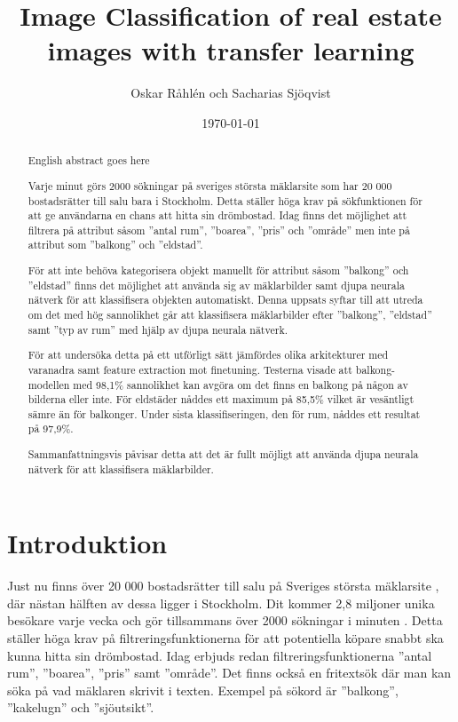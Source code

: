 \documentclass[]{kththesis}
\title{Image Classification of real estate images with transfer learning}
\author{Oskar Råhlén och Sacharias Sjöqvist}
\date{\today}
\begin{document}
\frontmatter
\titlepage

\begin{abstract}
    English abstract goes here
\end{abstract}

\begin{otherlanguage}{swedish}
  \begin{abstract}
    Varje minut görs 2000 sökningar på sveriges största mäklarsite som har 20 000 bostadsrätter till salu bara i Stockholm.
    Detta ställer höga krav på sökfunktionen för att ge användarna en chans att hitta sin drömbostad. 
    Idag finns det möjlighet att filtrera på attribut såsom ”antal rum”, ”boarea”, ”pris” och ”område” men inte på attribut som ”balkong” och ”eldstad”.

    För att inte behöva kategorisera objekt manuellt för attribut såsom ”balkong” och ”eldstad” finns det möjlighet att använda sig av mäklarbilder samt djupa neurala nätverk för att klassifisera objekten automatiskt.
    Denna uppsats syftar till att utreda om det med hög sannolikhet går att klassifisera mäklarbilder efter ”balkong”, ”eldstad” samt ”typ av rum” med hjälp av djupa neurala nätverk.
    
    För att undersöka detta på ett utförligt sätt jämfördes olika arkitekturer med varanadra samt feature extraction mot finetuning.
    Testerna visade att balkong-modellen med 98,1\% sannolikhet kan avgöra om det finns en balkong på någon av bilderna eller inte.
    För eldstäder nåddes ett maximum på 85,5\% vilket är vesäntligt sämre än för balkonger.
    Under sista klassifiseringen, den för rum, nåddes ett resultat på 97,9\%.

    Sammanfattningsvis påvisar detta att det är fullt möjligt att använda djupa neurala nätverk för att klassifisera mäklarbilder. 
    

  \end{abstract}
\end{otherlanguage}
  
\tableofcontents

\mainmatter

\chapter{Introduktion}

Just nu finns över 20 000 bostadsrätter \parencite{hemnetstats} till salu på Sveriges största mäklarsite \parencite{hemnetom}, där nästan hälften av dessa ligger i Stockholm. 
Dit kommer 2,8 miljoner unika besökare varje vecka och gör tillsammans över 2000 sökningar i minuten \parencite{hemnetom}.
Detta ställer höga krav på filtreringsfunktionerna för att potentiella köpare snabbt ska kunna hitta sin drömbostad.
Idag erbjuds redan filtreringsfunktionerna ”antal rum”, ”boarea”, ”pris” samt ”område”. 
Det finns också en fritextsök där man kan söka på vad mäklaren skrivit i texten.
Exempel på sökord är ”balkong”, ”kakelugn” och ”sjöutsikt”. 
\end{document}
